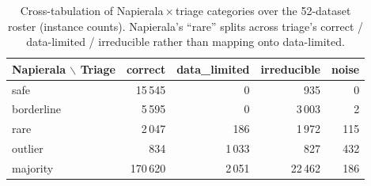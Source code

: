 \begin{table}[t]
\centering
\caption{Cross-tabulation of Napierala\,$\times$\,triage categories over the 52-dataset roster (instance counts). Napierala's ``rare'' splits across triage's correct / data-limited / irreducible rather than mapping onto data-limited.}
\label{tab:agreement}
\begin{tabular}{lrrrr}
\toprule
Napierala $\backslash$ Triage & correct & data\_limited & irreducible & noise \\
\midrule
safe & 15\,545 & 0 & 935 & 0 \\
borderline & 5\,595 & 0 & 3\,003 & 2 \\
rare & 2\,047 & 186 & 1\,972 & 115 \\
outlier & 834 & 1\,033 & 827 & 432 \\
majority & 170\,620 & 2\,051 & 22\,462 & 186 \\
\bottomrule
\end{tabular}
\end{table}
